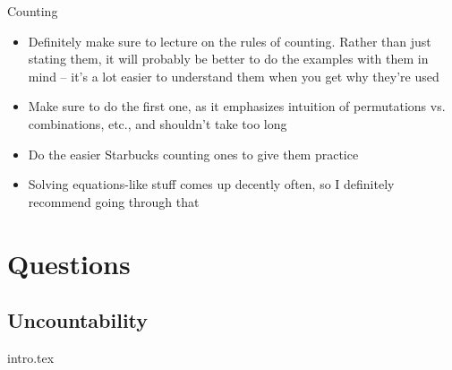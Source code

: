 \documentclass{exam}
\begin{document}
\begin{questions}
\begin{itemize}
\end{itemize}
\item Counting
\begin{itemize}
\item Definitely make sure to lecture on the rules of counting. Rather than just stating them, it will probably be better to do the examples with them in mind – it’s a lot easier to understand them when you get why they’re used
\item Make sure to do the first one, as it emphasizes intuition of permutations vs. combinations, etc., and shouldn’t take too long
\item Do the easier Starbucks counting ones to give them practice
\item Solving equations-like stuff comes up decently often, so I definitely recommend going through that
\end{itemize}
\end{questions}

\section{Questions}
\subsection{Uncountability}
\begin{enumerate}
{intro.tex}
\end{enumerate}
\end{document}
